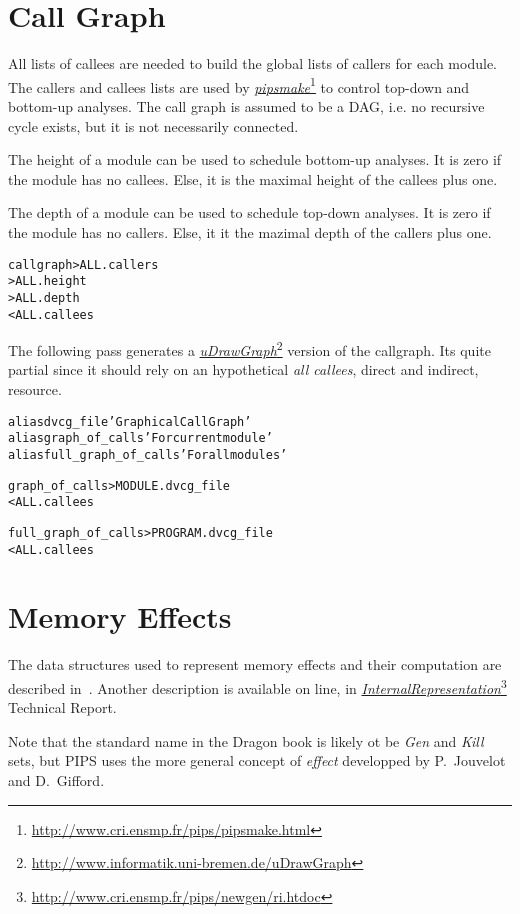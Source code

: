 \documentclass[a4paper]{report}
\newenvironment{PipsMake}{\begin{alltt}}{\end{alltt}}
\newcommand{\LINK}[2]{\href{#2}{#1}\footnote{\url{#2}}\xspace}
\newcommand{\PIPSMAKE}{\LINK{\emph{pipsmake}}{http://www.cri.ensmp.fr/pips/pipsmake.html}\xspace}
\newcommand{\PuDrawGraph}{\LINK{\emph{uDrawGraph}}{http://www.informatik.uni-bremen.de/uDrawGraph}\xspace}
\newcommand{\Pri}{\LINK{\emph{Internal\space{}Representation}}{http://www.cri.ensmp.fr/pips/newgen/ri.htdoc}}
\begin{document}
\section{Call Graph}
\label{subsection-call-graph}

All lists of callees are needed to build the global lists of callers
for each module. The callers and callees lists are used by \PIPSMAKE{}
to control top-down and bottom-up analyses. The call graph is
assumed to be a DAG, i.e. no recursive cycle exists, but it is not
necessarily connected.

The height of a module can be used to schedule bottom-up analyses. It is
zero if the module has no callees. Else, it is the maximal height of the
callees plus one.

The depth of a module can be used to schedule top-down analyses. It is
zero if the module has no callers. Else, it it the mazimal depth of the
callers plus one.

\begin{PipsMake}
callgraph                       > ALL.callers
                                > ALL.height
                                > ALL.depth
        < ALL.callees
\end{PipsMake}

The following pass generates a \PuDrawGraph version of the callgraph.  Its
quite partial since it should rely on an hypothetical \emph{all callees},
direct and indirect, resource.

\begin{PipsMake}
alias dvcg_file 'Graphical Call Graph'
alias graph_of_calls 'For current module'
alias full_graph_of_calls 'For all modules'

graph_of_calls               > MODULE.dvcg_file
        < ALL.callees

full_graph_of_calls          > PROGRAM.dvcg_file
        < ALL.callees
\end{PipsMake}

\section{Memory Effects}
\label{subsection-effects}

The data structures used to represent memory effects and their
computation are described in~\cite{IJT92}. Another description is
available on line, in \Pri{} Technical Report.

Note that the standard name in the Dragon book is likely ot be {\em
Gen} and {\em Kill} sets, but PIPS uses the more general concept of
{\em effect} developped by P.~Jouvelot and D.~Gifford.
\end{document}
